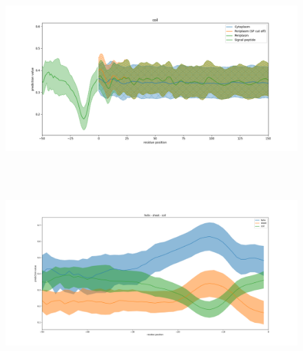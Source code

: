~\begin{figure}[h!]
	\includegraphics[width=\linewidth]
	{./results/general_comparison/img/coil.png}
~\end{figure}

~\begin{figure}[h!]
	\includegraphics[width=\linewidth]
	{./results/general_comparison/img/signal_peptide.png}
~\end{figure}
